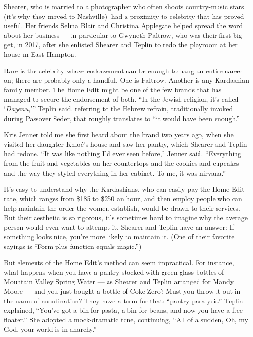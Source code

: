 Shearer, who is married to a photographer who often shoots country-music
stars (it's why they moved to Nashville), had a proximity to celebrity
that has proved useful. Her friends Selma Blair and Christina Applegate
helped spread the word about her business --- in particular to Gwyneth
Paltrow, who was their first big get, in 2017, after she enlisted
Shearer and Teplin to redo the playroom at her house in East Hampton.

Rare is the celebrity whose endorsement can be enough to hang an entire
career on; there are probably only a handful. One is Paltrow. Another is
any Kardashian family member. The Home Edit might be one of the few
brands that has managed to secure the endorsement of both. ``In the
Jewish religion, it's called `\emph{Dayenu},''' Teplin said, referring
to the Hebrew refrain, traditionally invoked during Passover Seder, that
roughly translates to ``it would have been enough.''

Kris Jenner told me she first heard about the brand two years ago, when
she visited her daughter Khloé's house and saw her pantry, which Shearer
and Teplin had redone. ``It was like nothing I'd ever seen before,''
Jenner said. ``Everything from the fruit and vegetables on her
countertops and the cookies and cupcakes and the way they styled
everything in her cabinet. To me, it was nirvana.''

It's easy to understand why the Kardashians, who can easily pay the Home
Edit rate, which ranges from \$185 to \$250 an hour, and then employ
people who can help maintain the order the women establish, would be
drawn to their services. But their aesthetic is so rigorous, it's
sometimes hard to imagine why the average person would even want to
attempt it. Shearer and Teplin have an answer: If something looks nice,
you're more likely to maintain it. (One of their favorite sayings is
``Form plus function equals magic.'')

But elements of the Home Edit's method can seem impractical. For
instance, what happens when you have a pantry stocked with green glass
bottles of Mountain Valley Spring Water --- as Shearer and Teplin
arranged for Mandy Moore --- and you just bought a bottle of Coke Zero?
Must you throw it out in the name of coordination? They have a term for
that: ``pantry paralysis.'' Teplin explained, ``You've got a bin for
pasta, a bin for beans, and now you have a free floater.'' She adopted a
mock-dramatic tone, continuing, ``All of a sudden, Oh, my God, your
world is in anarchy.''

